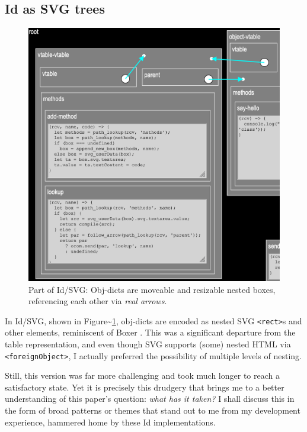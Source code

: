 \hypertarget{id-as-svg-trees}{%
\subsection{Id as SVG trees}\label{id-as-svg-trees}}

\begin{figure}
  \centering
  \includegraphics[width=\linewidth]{orom-svg.png}
  \caption{Part of Id{}/SVG: Obj-dicts are moveable and resizable nested boxes,
           referencing each other via \emph{real arrows}.\label{fig:orom-svg}}
\end{figure}

In Id{}/SVG, shown in Figure\textasciitilde{}\ref{fig:orom-svg},
obj-dicts are encoded as nested SVG
\texttt{\textless{}rect\textgreater{}}s and other elements, reminiscent
of Boxer \cite{boxer}. This was a significant departure from the table
representation, and even though SVG supports (some) nested HTML via
\texttt{\textless{}foreignObject\textgreater{}}, I actually preferred
the possibility of multiple levels of nesting.

Still, this version was far more challenging and took much longer to
reach a satisfactory state. Yet it is precisely this drudgery that
brings me to a better understanding of this paper's question: \emph{what
has it taken?} I shall discuss this in the form of broad patterns or
themes that stand out to me from my development experience, hammered
home by these Id{} implementations.

